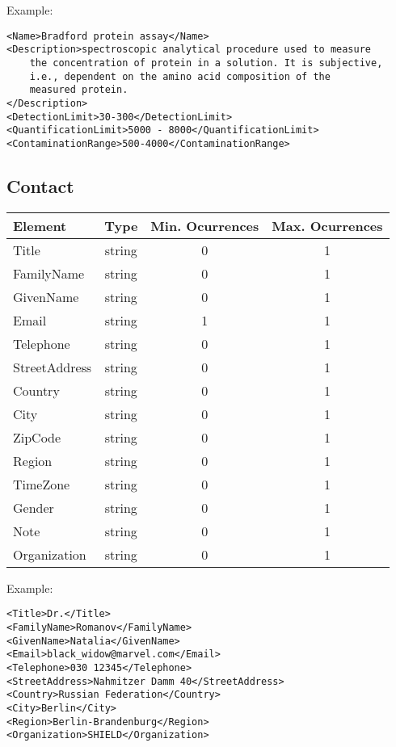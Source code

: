 \documentclass[a4paper]{report}
\begin{document}
Example:
\begin{lstlisting}[basicstyle=\footnotesize]
<Name>Bradford protein assay</Name>
<Description>spectroscopic analytical procedure used to measure
    the concentration of protein in a solution. It is subjective,
    i.e., dependent on the amino acid composition of the
    measured protein.
</Description>
<DetectionLimit>30-300</DetectionLimit>
<QuantificationLimit>5000 - 8000</QuantificationLimit>
<ContaminationRange>500-4000</ContaminationRange>
\end{lstlisting}

\subsection{Contact}

\begin{tabular}{|l|c|c|c|}
    \hline
    \textbf{Element} & \textbf{Type} & \textbf{Min. Ocurrences} & \textbf{Max. Ocurrences} \\
    \hline
    Title & string & 0 & 1 \\
    FamilyName & string & 0 & 1 \\
    GivenName & string & 0 & 1 \\
    Email & string & 1 & 1 \\
    Telephone & string & 0 & 1 \\
    StreetAddress & string & 0 & 1\\
    Country & string & 0 & 1 \\
    City & string & 0 & 1 \\
    ZipCode & string & 0 & 1 \\
    Region & string & 0 & 1 \\
    TimeZone & string & 0 & 1 \\
    Gender & string & 0 & 1 \\
    Note & string & 0 & 1 \\
    Organization & string & 0 & 1 \\
    \hline
\end{tabular}

Example:
\begin{lstlisting}[basicstyle=\footnotesize]
<Title>Dr.</Title>
<FamilyName>Romanov</FamilyName>
<GivenName>Natalia</GivenName>
<Email>black_widow@marvel.com</Email>
<Telephone>030 12345</Telephone>
<StreetAddress>Nahmitzer Damm 40</StreetAddress>
<Country>Russian Federation</Country>
<City>Berlin</City>
<Region>Berlin-Brandenburg</Region>
<Organization>SHIELD</Organization>
\end{lstlisting}
\end{document}
